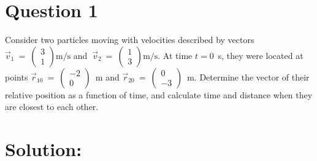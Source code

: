 \section*{Question 1}
Consider two particles moving with velocities described by vectors $\vec v_{1}~=~\begin{pmatrix} 3 \\ 1 \end{pmatrix}\text{m/s}$ and $~\vec v_{2}~=~\begin{pmatrix} 1 \\ 3 \end{pmatrix}\text{m/s.}$ At time $t = 0$~s, they were located at points $\vec r_{10}~=~\begin{pmatrix} -2 \\ 0 \end{pmatrix}$~m and $\vec r_{20}~=~\begin{pmatrix} 0 \\ -3 \end{pmatrix}$~m. Determine the vector of their relative position as a function of time, and calculate time and distance when they are closest to each other.

\section*{Solution:}